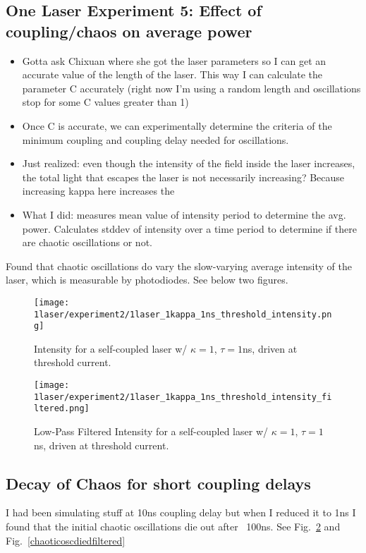 \documentclass[11pt,letterpaper]{article}
\begin{document}
\subsection{One Laser Experiment 5: Effect of coupling/chaos on average power}

\begin{itemize}
    \item Gotta ask Chixuan where she got the laser parameters so I can get an accurate value of the length of the laser. This way I can calculate the parameter C accurately (right now I'm using a random length and oscillations stop for some C values greater than 1)
    \item Once C is accurate, we can experimentally determine the criteria of the minimum coupling and coupling delay needed for oscillations.
    \item Just realized: even though the intensity of the field inside the laser increases, the total light that escapes the laser is not necessarily increasing? Because increasing kappa here increases the 
    \item What I did: measures mean value of intensity period to determine the avg. power. Calculates stddev of intensity over a time period to determine if there are chaotic oscillations or not.
\end{itemize}

Found that chaotic oscillations do vary the slow-varying average intensity of the laser, which is measurable by photodiodes. See below two figures.

\begin{figure}[H]
\centering
\texttt{[image: 1laser/experiment2/1laser\_1kappa\_1ns\_threshold\_intensity.png]}
\caption{Intensity for a self-coupled laser w/ $\kappa = 1$, $\tau = 1$ns, driven at threshold current.\label{chaoticoscdied}}
\end{figure}

\begin{figure}[H]
\centering
\texttt{[image: 1laser/experiment2/1laser\_1kappa\_1ns\_threshold\_intensity\_filtered.png]}
\caption{Low-Pass Filtered Intensity for a self-coupled laser w/ $\kappa = 1$, $\tau = 1$ns, driven at threshold current.\label{chaoticoscdied}}
\end{figure}

\subsection{Decay of Chaos for short coupling delays}
I had been simulating stuff at 10ns coupling delay but when I reduced it to 1ns I found that the initial chaotic oscillations die out after ~100ns. See Fig.~\ref{chaoticoscdied} and Fig.~\ref{chaoticoscdiedfiltered}
\end{document}
